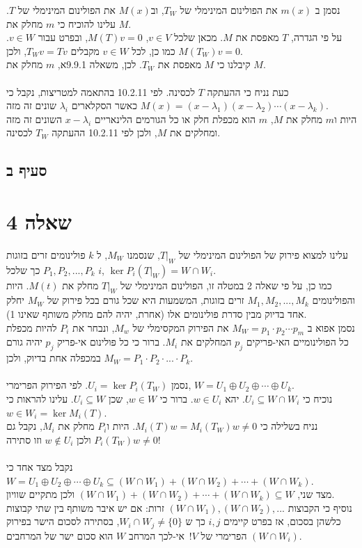\documentclass{article}
\begin{document}
נסמן ב $m(x)$ את הפולינום המינימלי של $T_W$, וב$M(x)$ את הפולינום המינימלי של $T$. עלינו להוכיח כי $m$ מחלק את $M$.\\
על פי הגדרה, $T$ מאפסת את $M$. מכאן שלכל $v\in V$, $M(T)v=0$, ובפרט עבור $v\in W$.
כמו כן, לכל $v\in W$ מקבלים $T_Wv=Tv$, ולכן $M(T_W)v=0$. \\
קיבלנו כי $M$ מאפסת את $T_W$. לכן, משאלה 9.9.1א, $m$ מחלק את $M$. \\\\
כעת נניח כי ההעתקה $T$ לכסינה. לפי 10.2.11 בהתאמה למטריצות, נקבל כי $M(x)=(x-\lambda_1)(x-\lambda_2)\cdots(x-\lambda_k)$ כאשר הסקלארים $\lambda_i$ שונים זה מזה. \\
היות ו$m$ מחלק את $M$, $m$ הוא מכפלת חלק או כל הגורמים הלינאריים $x-\lambda_i$ השונים זה מזה ומחלקים את $M$, ולכן לפי 10.2.11 ההעתקה $T_W$ לכסינה.

\subsection*{סעיף ב}

\pagebreak

\section*{שאלה 4}

עלינו למצוא פירוק של הפולינום המינימלי של $T|_W$, שנסמנו $M_W$, ל $k$ פולינומים זרים בזוגות $P_1, P_2, ..., P_k$ כך שלכל $i$, $\ker P_i(T|_W)=W\cap W_i$. \\
כמו כן, על פי שאלה 2 במטלה זו, הפולינום המינימלי של $T|_W$ מחלק את $M(t)$. היות והפולינומים $M_1, M_2, ..., M_k$ זרים בזוגות, המשמעות היא שכל גורם בכל פירוק של $M_W$ יחלק אחד בדיוק מבין סדרת פולינומים אלו (אחרת, יהיה להם מחלק משותף שאינו 1). \\
נסמן אפוא ב $M_W=p_1\cdot p_2\cdots p_m$ את הפירוק המקסימלי של $M_w$, ונבחר את $P_i$ להיות מכפלת כל הפולינומיים האי-פריקים $p_j$ המחלקים את $M_i$.
ברור כי כל פולינום אי-פריק $p_j$ יהיה גורם במכפלה אחת בדיוק, ולכן $M_W=P_1\cdot P_2\cdot ... \cdot P_k$. \\\\
נסמן $U_i=\ker P_i(T_W)$. לפי הפירוק הפרימרי, $W=U_1\oplus U_2\oplus\cdots\oplus U_k$. \\
נוכיח כי $U_i\subseteq W\cap W_i$. יהא $w\in U_i$. ברור כי $w\in W$, שכן $U_i\subseteq W$. עלינו להראות כי $w\in W_i=\ker M_i(T)$. \\
נניח בשלילה כי $M_i(T)w=M_i(T_W)w\ne 0$. היות ו$P_i$ מחלק את $M_i$, נקבל גם $P_i(T_W)w\ne 0$ ולכן $w\notin U_i$ וזו סתירה! \\\\
נקבל מצד אחד כי $W=U_1\oplus U_2\oplus\cdots\oplus U_k\subseteq (W\cap W_1)+(W\cap W_2)+\cdots + (W\cap W_k)$. \\
מצד שני, $(W\cap W_1)+(W\cap W_2)+\cdots+(W\cap W_k)\subseteq W$ ולכן מתקיים שוויון. \\
נוסיף כי הקבוצות $(W\cap W_1),(W\cap W_2), ...$ זרות: אם יש איבר משותף בין שתי קבוצות כלשהן בסכום, אז בפרט קיימים $i,j$ כך ש $W_i\cap W_j\ne \{0\}$, בסתירה לסכום הישר בפירוק הפרימרי של $V$!\
אי-לכך המרחב $W$ הוא סכום ישר של המרחבים $(W\cap W_i)$.
\end{document}
